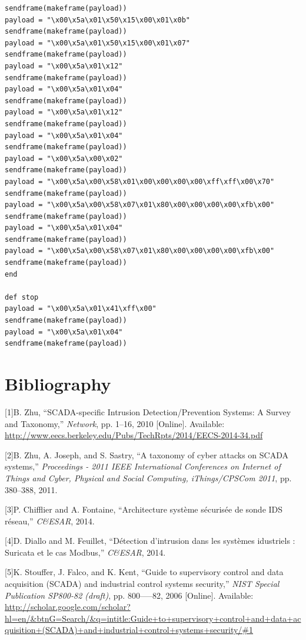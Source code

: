 \documentclass[12pt,]{article}
\begin{document}
\begin{verbatim}
sendframe(makeframe(payload))
payload = "\x00\x5a\x01\x50\x15\x00\x01\x0b"
sendframe(makeframe(payload))
payload = "\x00\x5a\x01\x50\x15\x00\x01\x07"
sendframe(makeframe(payload))
payload = "\x00\x5a\x01\x12"
sendframe(makeframe(payload))
payload = "\x00\x5a\x01\x04"
sendframe(makeframe(payload))
payload = "\x00\x5a\x01\x12"
sendframe(makeframe(payload))
payload = "\x00\x5a\x01\x04"
sendframe(makeframe(payload))
payload = "\x00\x5a\x00\x02"
sendframe(makeframe(payload))
payload = "\x00\x5a\x00\x58\x01\x00\x00\x00\x00\xff\xff\x00\x70"
sendframe(makeframe(payload))
payload = "\x00\x5a\x00\x58\x07\x01\x80\x00\x00\x00\x00\xfb\x00"
sendframe(makeframe(payload))
payload = "\x00\x5a\x01\x04"
sendframe(makeframe(payload))
payload = "\x00\x5a\x00\x58\x07\x01\x80\x00\x00\x00\x00\xfb\x00"
sendframe(makeframe(payload))
end

def stop
payload = "\x00\x5a\x01\x41\xff\x00"
sendframe(makeframe(payload))
payload = "\x00\x5a\x01\x04"
sendframe(makeframe(payload))
\end{verbatim}

\newpage

\section*{Bibliography}\label{bibliography}

{[}1{]}B. Zhu, ``SCADA-specific Intrusion Detection/Prevention Systems:
A Survey and Taxonomy,'' \emph{Network}, pp. 1--16, 2010 {[}Online{]}.
Available:
\url{http://www.eecs.berkeley.edu/Pubs/TechRpts/2014/EECS-2014-34.pdf}

{[}2{]}B. Zhu, A. Joseph, and S. Sastry, ``A taxonomy of cyber attacks
on SCADA systems,'' \emph{Proceedings - 2011 IEEE International
Conferences on Internet of Things and Cyber, Physical and Social
Computing, iThings/CPSCom 2011}, pp. 380--388, 2011.

{[}3{]}P. Chifflier and A. Fontaine, ``Architecture système sécurisée de
sonde IDS réseau,'' \emph{C\&ESAR}, 2014.

{[}4{]}D. Diallo and M. Feuillet, ``Détection d'intrusion dans les
systèmes idustriels : Suricata et le cas Modbus,'' \emph{C\&ESAR}, 2014.

{[}5{]}K. Stouffer, J. Falco, and K. Kent, ``Guide to supervisory
control and data acquisition (SCADA) and industrial control systems
security,'' \emph{NIST Special Publication SP800-82 (draft)}, pp.
800-----82, 2006 {[}Online{]}. Available:
\url{http://scholar.google.com/scholar?hl=en/\&btnG=Search/\&q=intitle:Guide+to+supervisory+control+and+data+acquisition+(SCADA)+and+industrial+control+systems+security/\#1}
\end{document}
